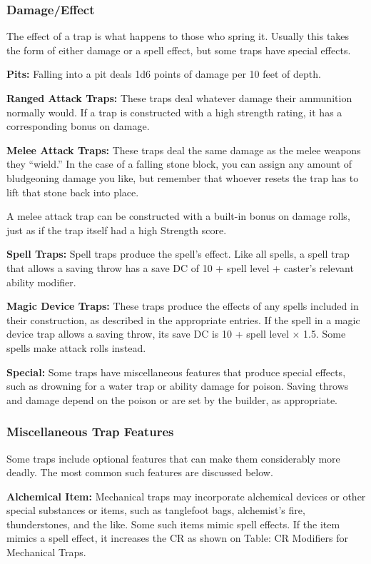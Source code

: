 \subsubsection{Damage/Effect}
The effect of a trap is what happens to those who spring it. Usually this takes the form of either damage or a spell effect, but some traps have special effects.

\textbf{Pits:} Falling into a pit deals 1d6 points of damage per 10 feet of depth.

\textbf{Ranged Attack Traps:} These traps deal whatever damage their ammunition normally would. If a trap is constructed with a high strength rating, it has a corresponding bonus on damage.

\textbf{Melee Attack Traps:} These traps deal the same damage as the melee weapons they “wield.” In the case of a falling stone block, you can assign any amount of bludgeoning damage you like, but remember that whoever resets the trap has to lift that stone back into place.

A melee attack trap can be constructed with a built-in bonus on damage rolls, just as if the trap itself had a high Strength score.

\textbf{Spell Traps:} Spell traps produce the spell’s effect. Like all spells, a spell trap that allows a saving throw has a save DC of 10 + spell level + caster’s relevant ability modifier.

\textbf{Magic Device Traps:} These traps produce the effects of any spells included in their construction, as described in the appropriate entries. If the spell in a magic device trap allows a saving throw, its save DC is 10 + spell level × 1.5. Some spells make attack rolls instead.

\textbf{Special:} Some traps have miscellaneous features that produce special effects, such as drowning for a water trap or ability damage for poison. Saving throws and damage depend on the poison or are set by the builder, as appropriate.

\subsubsection{Miscellaneous Trap Features}
Some traps include optional features that can make them considerably more deadly. The most common such features are discussed below.

\textbf{Alchemical Item:} Mechanical traps may incorporate alchemical devices or other special substances or items, such as tanglefoot bags, alchemist’s fire, thunderstones, and the like. Some such items mimic spell effects. If the item mimics a spell effect, it increases the CR as shown on Table: CR Modifiers for Mechanical Traps.

